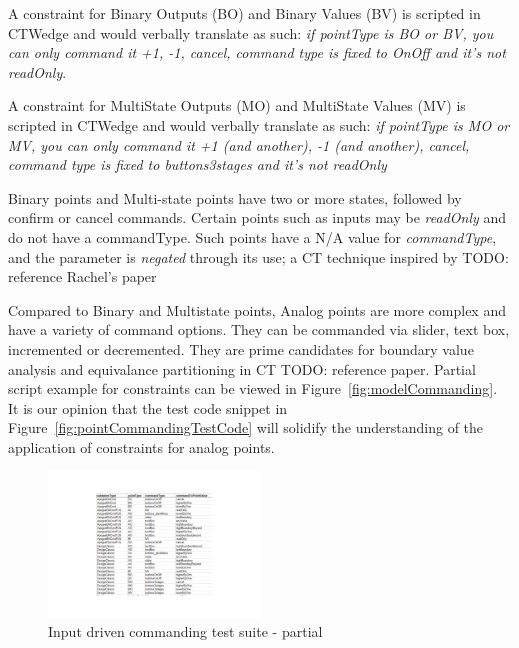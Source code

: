 \documentclass[conference]{IEEEtran}
\newcommand{\todo}[1]{}
\renewcommand{\todo}[1]{{\color{red} TODO: {#1}}}
\begin{document}
	A constraint for Binary Outputs (BO) and Binary Values (BV) is scripted in CTWedge and would verbally translate as such:
	\textit{if pointType is BO or BV, you can only command it +1, -1, cancel, command type is fixed to OnOff and it's not readOnly}.
	
	A constraint for MultiState Outputs (MO) and MultiState Values (MV) is scripted in CTWedge and would verbally translate as such:
	\textit{if pointType is MO or MV, you can only command it +1 (and another), -1 (and another), cancel, command type is fixed to buttons3stages and it's not readOnly}

	Binary points and Multi-state points have two or more states, followed by confirm or cancel commands. 
	Certain points such as inputs may be \textit{readOnly} and do not have a commandType. Such points have a N/A value for \textit{commandType}, and the parameter is \textit{negated} through its use; a CT technique inspired by \todo{reference Rachel's paper}	

	Compared to  Binary and Multistate points, Analog points are more complex and have a variety of command options.
	They can be commanded via slider, text box, incremented or decremented. 
	They are prime candidates for boundary value analysis and equivalance partitioning in CT \todo{reference paper}.
	Partial script example for constraints can be viewed in Figure~\ref{fig:modelCommanding}. 
	It is our opinion that the test code snippet in Figure~\ref{fig:pointCommandingTestCode} will solidify the understanding of the application of constraints for analog points.

	\begin{figure}[!b]
		\includegraphics[width=0.50\textwidth,]{csvOutputCommanding.pdf}
		\caption{Input driven commanding test suite - partial}
		\label{fig:csvOutputCommanding}
	\end{figure}
\end{document}
